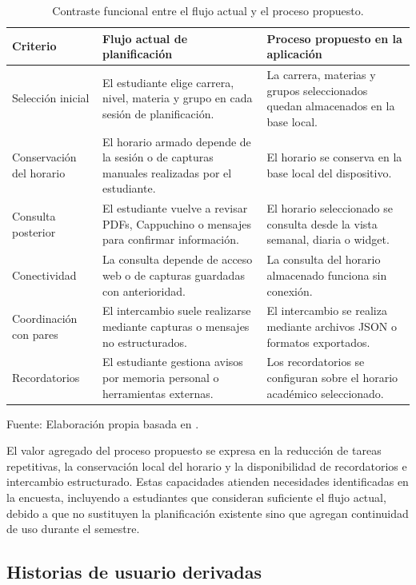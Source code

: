 \begin{table}[H]
\centering
\begin{tabularx}{\linewidth}{p{4.0cm} p{5.2cm} X}
\toprule
Criterio & Flujo actual de planificación & Proceso propuesto en la aplicación \\
\midrule
Selección inicial & El estudiante elige carrera, nivel, materia y grupo en cada sesión de planificación. & La carrera, materias y grupos seleccionados quedan almacenados en la base local. \\
Conservación del horario & El horario armado depende de la sesión o de capturas manuales realizadas por el estudiante. & El horario se conserva en la base local del dispositivo. \\
Consulta posterior & El estudiante vuelve a revisar PDFs, Cappuchino o mensajes para confirmar información. & El horario seleccionado se consulta desde la vista semanal, diaria o widget. \\
Conectividad & La consulta depende de acceso web o de capturas guardadas con anterioridad. & La consulta del horario almacenado funciona sin conexión. \\
Coordinación con pares & El intercambio suele realizarse mediante capturas o mensajes no estructurados. & El intercambio se realiza mediante archivos JSON o formatos exportados. \\
Recordatorios & El estudiante gestiona avisos por memoria personal o herramientas externas. & Los recordatorios se configuran sobre el horario académico seleccionado. \\
\bottomrule
\end{tabularx}
\caption{Contraste funcional entre el flujo actual y el proceso propuesto.}\label{tab:proceso_contraste}
\small{Fuente: Elaboración propia basada en \cite{encuesta_fcyt_2025}.}
\end{table}

El valor agregado del proceso propuesto se expresa en la reducción de tareas repetitivas, la conservación local del horario y la disponibilidad de recordatorios e intercambio estructurado. Estas capacidades atienden necesidades identificadas en la encuesta, incluyendo a estudiantes que consideran suficiente el flujo actual, debido a que no sustituyen la planificación existente sino que agregan continuidad de uso durante el semestre.

\subsection{Historias de usuario derivadas}\label{sec:historias_usuario}

